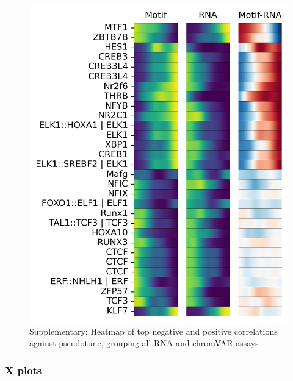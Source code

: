 \documentclass[a4paper]{article}
\begin{document}
\begin{figure}[!htb]
  \centering
  \includegraphics[width=\textwidth]{../figures/hematopoiesis/Neutrophil_40_106_single_smooth_none_heatmap_grouped_assays.png}
  \caption{Supplementary: Heatmap of top negative and positive correlations against pseudotime, grouping all RNA and chromVAR assays}
\end{figure}

\FloatBarrier
\subsubsection{X plots}
 
\end{document}
